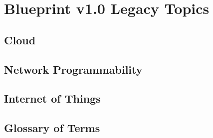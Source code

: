 \documentclass{article}
\begin{document}
\newpage
\section{Blueprint v1.0 Legacy Topics}
\subsection{Cloud}



\subsection{Network Programmability}

\subsection{Internet of Things}


\newpage
\subsection{Glossary of Terms}

\end{document}
